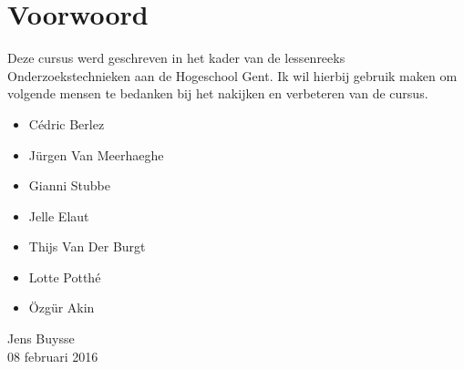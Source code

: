 

\chapter*{Voorwoord}
Deze cursus werd geschreven in het kader van de lessenreeks Onderzoekstechnieken aan de Hogeschool Gent. Ik wil hierbij gebruik maken om volgende mensen te bedanken bij het nakijken en verbeteren van de cursus.
\begin{itemize}
	\item C\'edric Berlez
	\item J\"urgen Van Meerhaeghe
	\item Gianni Stubbe
	\item Jelle Elaut
	\item Thijs Van Der Burgt
	\item Lotte Potth\'e
	\item \"Ozg\"ur Akin
\end{itemize}

\bigskip \bigskip
{\raggedleft	%
Jens Buysse\\
08 februari 2016\\
}
